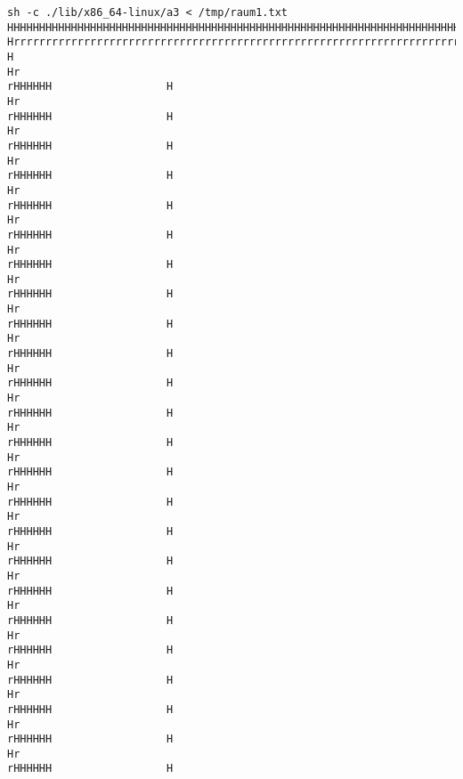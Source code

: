 \documentclass[10pt,a4paper]{article}
\begin{document}
{\begin{verbatim}
sh -c ./lib/x86_64-linux/a3 < /tmp/raum1.txt 
HHHHHHHHHHHHHHHHHHHHHHHHHHHHHHHHHHHHHHHHHHHHHHHHHHHHHHHHHHHHHHHHHHHHHHHHHHHHHHHHHHHHHHHHHHHHHHHHHHHH
HrrrrrrrrrrrrrrrrrrrrrrrrrrrrrrrrrrrrrrrrrrrrrrrrrrrrrrrrrrrrrrrrrrrrrrrrrrHHHHHH                  H
Hr                                                                        rHHHHHH                  H
Hr                                                                        rHHHHHH                  H
Hr                                                                        rHHHHHH                  H
Hr                                                                        rHHHHHH                  H
Hr                                                                        rHHHHHH                  H
Hr                                                                        rHHHHHH                  H
Hr                                                                        rHHHHHH                  H
Hr                                                                        rHHHHHH                  H
Hr                                                                        rHHHHHH                  H
Hr                                                                        rHHHHHH                  H
Hr                                                                        rHHHHHH                  H
Hr                                                                        rHHHHHH                  H
Hr                                                                        rHHHHHH                  H
Hr                                                                        rHHHHHH                  H
Hr                                                                        rHHHHHH                  H
Hr                                                                        rHHHHHH                  H
Hr                                                                        rHHHHHH                  H
Hr                                                                        rHHHHHH                  H
Hr                                                                        rHHHHHH                  H
Hr                                                                        rHHHHHH                  H
Hr                                                                        rHHHHHH                  H
Hr                                                                        rHHHHHH                  H
Hr                                                                        rHHHHHH                  H
Hr                                                                        rHHHHHH                  H

\end{verbatim}}
\end{document}
